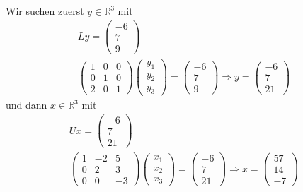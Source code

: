 \documentclass[11pt]{report}
\newcommand*\Zb[1] {\mathbb{#1}}
\begin{document}
Wir suchen zuerst $y \in \Zb{R}^3$ mit
\begin{align}
Ly = \begin{pmatrix} -6 \\ 7 \\ 9 \end{pmatrix} \\
\begin{pmatrix} 1 & 0 & 0 \\ 0 & 1 & 0 \\ 2 & 0 & 1 \end{pmatrix} \begin{pmatrix} y_1 \\ y_2 \\ y_3 \end{pmatrix} = \begin{pmatrix} -6 \\ 7 \\ 9 \end{pmatrix} \Rightarrow y = \begin{pmatrix} -6 \\ 7 \\ 21 \end{pmatrix}
\end{align}
und dann $x \in \Zb{R}^3$ mit 
\begin{align}
Ux = \begin{pmatrix} -6 \\ 7 \\ 21 \end{pmatrix} \\
\begin{pmatrix} 1 & -2 & 5 \\ 0 & 2 & 3 \\ 0 & 0 & -3 \end{pmatrix} \begin{pmatrix} x_1 \\ x_2 \\ x_3 \end{pmatrix} = \begin{pmatrix} -6 \\ 7 \\ 21 \end{pmatrix} \Rightarrow x = \begin{pmatrix} 57 \\ 14 \\ -7 \end{pmatrix}
\end{align}
\end{document}
